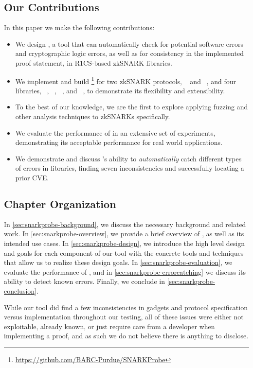 \subsection{Our Contributions}
In this paper we make the following contributions:

\begin{itemize}[leftmargin=*]
    \setlength{\itemsep}{0pt}
    \setlength{\parskip}{0pt}
		\item We design \snarkprobe, a tool that can automatically check for potential software errors and cryptographic logic errors, as well as for consistency in the implemented proof statement, in R1CS-based zkSNARK libraries.
		\item We implement and build \snarkprobe\footnote{\url{https://github.com/BARC-Purdue/SNARKProbe}} for two zkSNARK protocols, \pinocchio~\cite{parno2016pinocchio,ben2014succinct} and ~\cite{groth2016size}, and four libraries, \libsnark~\cite{libsnark}, \bellman~\cite{bellman}, \arkworks~\cite{arkworks}, and \gnark~\cite{gnark}, to demonstrate its flexibility and extensibility.
		\item To the best of our knowledge, we are the first to explore applying fuzzing and other analysis techniques to zkSNARKs specifically.
	  \item We evaluate the performance of \snarkprobe in an extensive set of experiments, demonstrating its acceptable performance for real world applications.
		\item We demonstrate and discuss \snarkprobe's ability to \emph{automatically} catch different types of errors in \zksnark libraries, finding seven inconsistencies and successfully locating a prior CVE.
\end{itemize}

\subsection{Chapter Organization}
In \autoref{sec:snarkprobe-background}, we discuss the necessary background and related work.  In \autoref{sec:snarkprobe-overview}, we provide a brief overview of \snarkprobe, as well as its intended use cases.  In \autoref{sec:snarkprobe-design}, we introduce the high level design and goals for each component of our tool with the concrete tools and techniques that allow us to realize these design goals.  In \autoref{sec:snarkprobe-evaluation}, we evaluate the performance of \snarkprobe, and in \autoref{sec:snarkprobe-errorcatching} we discuss its ability to detect known errors.  Finally, we conclude in \autoref{sec:snarkprobe-conclusion}.

While our tool did find a few inconsistencies in gadgets and protocol specification versus implementation throughout our testing, all of these issues were either not exploitable, already known, or just require care from a developer when implementing a proof, and as such we do not believe there is anything to disclose.
